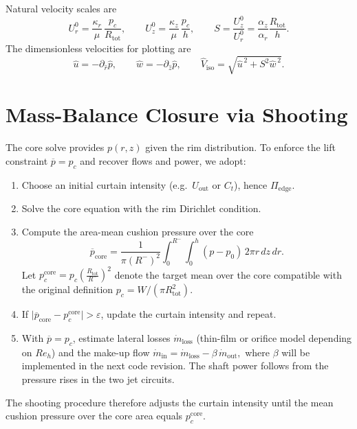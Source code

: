 \documentclass[11pt,a4paper]{article}
\begin{document}
Natural velocity scales are
\begin{equation}
  U_r^0=\frac{\kappa_r}{\mu}\,\frac{p_c}{R_{\mathrm{tot}}},\qquad
  U_z^0=\frac{\kappa_z}{\mu}\,\frac{p_c}{h},\qquad
  S=\frac{U_z^0}{U_r^0}=\frac{\alpha_z}{\alpha_r}\frac{R_{\mathrm{tot}}}{h}.
\end{equation}
The dimensionless velocities for plotting are
\begin{equation}
  \hat u=-\partial_{\hat r}\hat p,\qquad
  \hat w=-\partial_{\hat z}\hat p,\qquad
  \hat V_{\mathrm{iso}}=\sqrt{\hat u^{\,2}+S^{2}\hat w^{\,2}}.
\end{equation}

\section{Mass-Balance Closure via Shooting}
\label{sec:shooting}
The core solve provides $p(r,z)$ given the rim distribution. To enforce the lift
constraint $\overline{p}=p_c$ and recover flows and power, we adopt:
\begin{enumerate}
  \item Choose an initial curtain intensity (e.g.\ $U_{\mathrm{out}}$ or $C_t$), hence
        $\Pi_{\mathrm{edge}}$.
  \item Solve the core equation with the rim Dirichlet condition.
  \item Compute the area-mean cushion pressure over the core
  \[
    \overline{p}_{\mathrm{core}}=\frac{1}{\pi (R^-)^2}
    \int_0^{R^{-}}\!\!\int_0^h (p-p_0)\,2\pi r\,dz\,dr.
  \]
  Let $p_c^{\mathrm{core}} = p_c \left(\frac{R_{\mathrm{tot}}}{R^-}\right)^2$ denote the
  target mean over the core compatible with the original definition
  $p_c=W/(\pi R_{\mathrm{tot}}^2)$.
  \item If $\big|\overline{p}_{\mathrm{core}}-p_c^{\mathrm{core}}\big|>\varepsilon$, update
  the curtain intensity and repeat.

  \item With $\overline{p}=p_c$, estimate lateral losses $\dot m_{\mathrm{loss}}$ (thin-film
  or orifice model depending on $Re_h$) and the make-up flow
  \(
    \dot m_{\mathrm{in}}=\dot m_{\mathrm{loss}}-\beta\,\dot m_{\mathrm{out}},
  \)
  where $\beta$ will be implemented in the next code revision. The shaft power follows
  from the pressure rises in the two jet circuits.
\end{enumerate}
The shooting procedure therefore adjusts the curtain intensity until the mean cushion
pressure over the core area equals $p_c^{\mathrm{core}}$.
\end{document}
